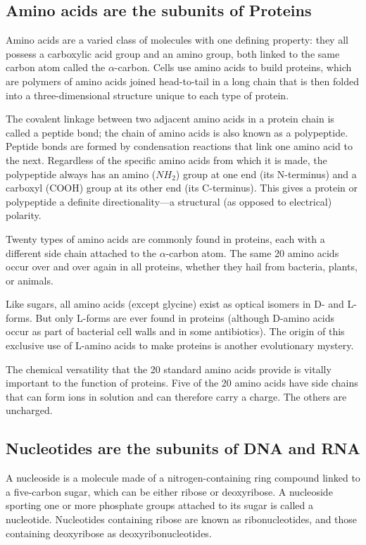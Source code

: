 \subsection{Amino acids are the subunits of Proteins}

Amino acids are a varied class of molecules with one defining property:
they all possess a carboxylic acid group and an amino group, both
linked to the same carbon atom called the $\alpha$-carbon.
Cells use amino acids to build proteins, which are polymers of
amino acids joined head-to-tail in a long chain that is then folded into a
three-dimensional structure unique to each type of protein.

The covalent linkage between two adjacent amino acids in a protein
chain is called a peptide bond; the chain of amino acids is also known as
a polypeptide. Peptide bonds are formed by condensation
reactions that link one amino acid to the next. Regardless of the specific
amino acids from which it is made, the polypeptide always has an amino
($NH_{2}$) group at one end (its N-terminus) and a carboxyl (COOH) group at
its other end (its C-terminus). This gives a protein or polypeptide a definite
directionality—a structural (as opposed to electrical) polarity.

Twenty types of amino acids are commonly found in proteins, each with a
different side chain attached to the $\alpha$-carbon atom.
The same 20 amino acids occur over and over again in all proteins,
whether they hail from bacteria, plants, or animals.

Like sugars, all amino acids (except glycine) exist as optical isomers in D-
and L-forms. But only L-forms are ever found in proteins
(although D-amino acids occur as part of bacterial cell walls and in some
antibiotics). The origin of this exclusive use of L-amino acids to make
proteins is another evolutionary mystery.

The chemical versatility that the 20 standard amino acids provide is
vitally important to the function of proteins. Five of the 20 amino acids
have side chains that can form ions in solution and can therefore carry
a charge. The others are uncharged.

\subsection{Nucleotides are the subunits of DNA and RNA}

A nucleoside is a molecule made of a nitrogen-containing ring compound
linked to a five-carbon sugar, which can be either ribose or deoxyribose.
A nucleoside sporting one or more phosphate
groups attached to its sugar is called a nucleotide. Nucleotides containing
ribose are known as ribonucleotides, and those containing deoxyribose as
deoxyribonucleotides.

